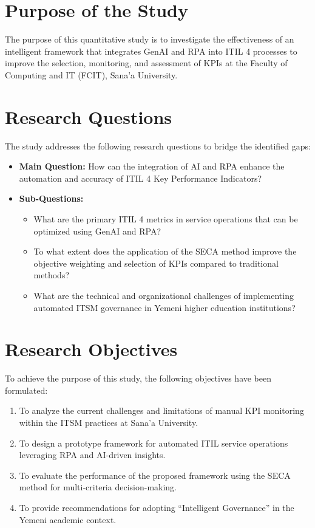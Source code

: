 \documentclass[12pt,a4paper,oneside]{report}
\begin{document}
\section{Purpose of the Study}
The purpose of this quantitative study is to investigate the effectiveness of an intelligent framework that integrates GenAI and RPA into ITIL 4 processes to improve the selection, monitoring, and assessment of KPIs at the Faculty of Computing and IT (FCIT), Sana'a University.

\section{Research Questions}
The study addresses the following research questions to bridge the identified gaps:
\begin{itemize}
    \item \textbf{Main Question:} How can the integration of AI and RPA enhance the automation and accuracy of ITIL 4 Key Performance Indicators?
    \item \textbf{Sub-Questions:}
    \begin{itemize}
        \item What are the primary ITIL 4 metrics in service operations that can be optimized using GenAI and RPA?
        \item To what extent does the application of the SECA method improve the objective weighting and selection of KPIs compared to traditional methods?
        \item What are the technical and organizational challenges of implementing automated ITSM governance in Yemeni higher education institutions?
    \end{itemize}
\end{itemize}

\section{Research Objectives}
To achieve the purpose of this study, the following objectives have been formulated:
\begin{enumerate}
    \item To analyze the current challenges and limitations of manual KPI monitoring within the ITSM practices at Sana'a University.
    \item To design a prototype framework for automated ITIL service operations leveraging RPA and AI-driven insights.
    \item To evaluate the performance of the proposed framework using the SECA method for multi-criteria decision-making.
    \item To provide recommendations for adopting ``Intelligent Governance'' in the Yemeni academic context.
\end{enumerate}
\end{document}
